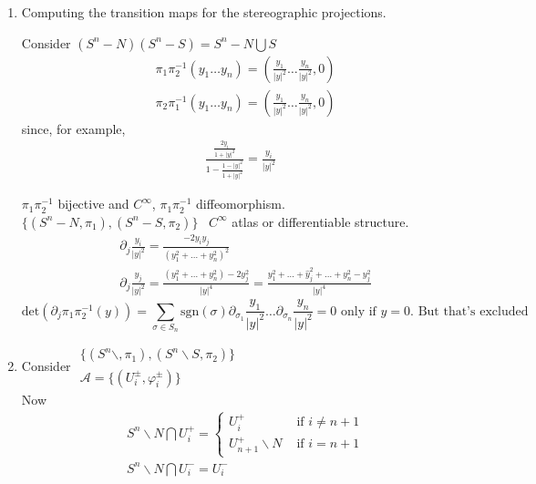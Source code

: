 \documentclass[11pt]{amsart}
\theoremstyle{definition}
\begin{document}
\begin{enumerate}
\item[(c)] Computing the transition maps for the stereographic projections.


Consider $(S^n - N)(S^n-S) = S^n - N \bigcup S$
\[
\begin{aligned}
  & \pi_1 \pi_2^{-1}(y_1 \dots y_n) = \left( \frac{y_1 }{ |y|^2} \dots \frac{y_n}{|y|^2} , 0 \right) \\
  & \pi_2 \pi_1^{-1}(y_1 \dots y_n) = \left( \frac{y_1 }{ |y|^2} \dots \frac{y_n}{|y|^2} , 0 \right)
\end{aligned}
\]
since, for example,
\[
\begin{gathered}
\frac{   \frac{2y_i }{ 1 + |y|^2} }{ 1 - \frac{ 1 - |y|^2}{ 1 + |y|^2 }} = \frac{y_i }{ |y|^2 }
\end{gathered}
\]



$\pi_1 \pi_2^{-1}$ bijective and $C^{\infty}$, $\pi_1 \pi_2^{-1}$ diffeomorphism.   \\

$\lbrace (S^n-N, \pi_1), (S^n - S, \pi_2) \rbrace$ \, $C^{\infty}$ atlas or differentiable structure.
\[
\begin{aligned}
  & \partial_j \frac{y_i}{ |y|^2} = \frac{ - 2y_i y_j }{ (y_1^2 + \dots + y_n^2 )^2 } \\
  & \partial_j \frac{ y_j}{ |y|^2} = \frac{ (y_1^2 + \dots + y_n^2) - 2y_j^2 }{ |y|^4} = \frac{ y_1^2 + \dots + \widehat{y}_j^2 + \dots + y_n^2 - y_j^2 }{ |y|^4}
\end{aligned}
\]
\[
\text{det}{ (\partial_j \pi_1 \pi_2^{-1}(y) ) } = \sum_{ \sigma \in S_n} \text{sgn}{ (\sigma)} \partial_{\sigma_1} \frac{y_1}{ |y|^2} \dots \partial_{\sigma_n} \frac{y_n}{|y|^2} = 0 \text{ only if $y=0$. But that's excluded }
\]
\item[(d)] Consider $\begin{gathered}
  \lbrace ( S^n\backslash, \pi_1), (S^n \backslash S, \pi_2) \rbrace \\
  \mathcal{A} = \lbrace (U_i^{\pm}, \varphi_i^{\pm}) \rbrace \end{gathered}$  \\

Now
\[
\begin{aligned}
  & S^n \backslash N \bigcap U_i^+ = \begin{cases} U_i^+ & \text{ if } i \neq n + 1 \\ U_{n+1}^+ \backslash N & \text{ if } i = n+1 \end{cases} \\
  & S^n \backslash N \bigcap U_i^- = U_i^-
\end{aligned}
\]


\end{enumerate}
\end{document}
